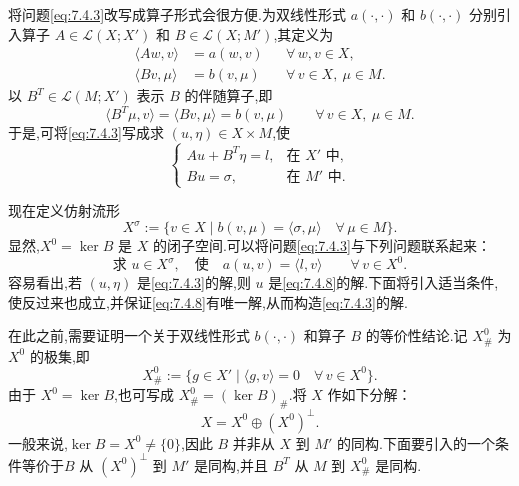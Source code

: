 将问题\eqref{eq:7.4.3}改写成算子形式会很方便.为双线性形式 \(a(\cdot,\cdot)\) 和 \(b(\cdot,\cdot)\) 分别引入算子 \(A\in\mathcal L(X;X')\) 和 \(B\in\mathcal L(X;M')\),其定义为
\begin{align}
  \langle Aw,v\rangle&=a(w,v)&&\forall\,w,v\in X,\label{eq:7.4.4}\\
  \langle Bv,\mu\rangle&=b(v,\mu)&&\forall\,v\in X,\ \mu\in M.\label{eq:7.4.5}
\end{align}
以 \(B^T\in\mathcal L(M;X')\) 表示 \(B\) 的伴随算子,即
\begin{equation}\label{eq:7.4.6}
  \langle B^T\mu,v\rangle=\langle Bv,\mu\rangle=b(v,\mu)
      \qquad\forall\,v\in X,\ \mu\in M.
\end{equation}
于是,可将\eqref{eq:7.4.3}写成求 \((u,\eta)\in X\times M\),使
\begin{equation}\label{eq:7.4.7}
  \begin{cases}
    Au+B^T\eta=l,&\text{在 }X'\text{ 中},\\
    Bu=\sigma,&\text{在 }M'\text{ 中}.
  \end{cases}
\end{equation}

现在定义仿射流形
\[
  X^\sigma:=\{v\in X\mid b(v,\mu)=\langle\sigma,\mu\rangle
      \quad\forall\,\mu\in M\}.
\]
显然,\(X^0=\ker B\) 是 \(X\) 的闭子空间.可以将问题\eqref{eq:7.4.3}与下列问题联系起来：
\begin{equation}\label{eq:7.4.8}
  \text{求 }u\in X^\sigma,\quad\text{使}\quad
    a(u,v)=\langle l,v\rangle\qquad\forall\,v\in X^0.
\end{equation}
容易看出,若 \((u,\eta)\) 是\eqref{eq:7.4.3}的解,则 \(u\) 是\eqref{eq:7.4.8}的解.下面将引入适当条件,使反过来也成立,并保证\eqref{eq:7.4.8}有唯一解,从而构造\eqref{eq:7.4.3}的解.

在此之前,需要证明一个关于双线性形式 \(b(\cdot,\cdot)\) 和算子 \(B\) 的等价性结论.记 \(X_\#^0\) 为 \(X^0\) 的极集,即
\begin{equation}\label{eq:7.4.9}
  X_\#^0:=\{g\in X'\mid\langle g,v\rangle=0\quad\forall\,v\in X^0\}.
\end{equation}
由于 \(X^0=\ker B\),也可写成 \(X_\#^0=(\ker B)_\#\).将 \(X\) 作如下分解：
\[
  X=X^0\oplus(X^0)^\perp.
\]
一般来说,\(\ker B=X^0\ne\{0\}\),因此 \(B\) 并非从 \(X\) 到 \(M'\) 的同构.下面要引入的一个条件等价于\(B\) 从 \((X^0)^\perp\) 到 \(M'\) 是同构,并且 \(B^T\) 从 \(M\) 到 \(X_\#^0\) 是同构.

